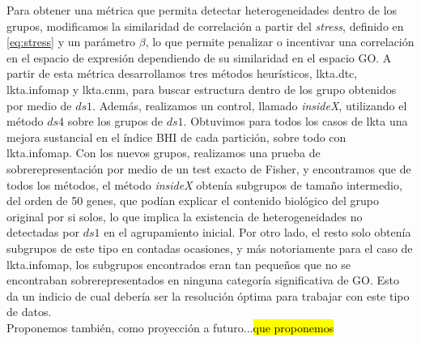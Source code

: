 Para obtener una métrica que permita detectar heterogeneidades dentro de los grupos, modificamos la similaridad de correlación a partir del \textit{stress}, definido en \ref{eq:stress} y un parámetro $\beta$, lo que permite penalizar o incentivar una correlación en el espacio de expresión dependiendo de su similaridad en el espacio GO. A partir de esta métrica desarrollamos tres métodos heurísticos, lkta.dtc, lkta.infomap y lkta.cnm, para buscar estructura dentro de los grupo obtenidos por medio de $ds1$. Además, realizamos un control, llamado \textit{insideX}, utilizando el método $ds4$ sobre los grupos de $ds1$. Obtuvimos para todos los casos de lkta una mejora sustancial en el índice BHI de cada partición, sobre todo con lkta.infomap. Con los nuevos grupos, realizamos una prueba de sobrerepresentación por medio de un test exacto de Fisher, y encontramos que de todos los métodos, el método \textit{insideX} obtenía subgrupos de tamaño intermedio, del orden de 50 genes, que podían explicar el contenido biológico del grupo original por si solos, lo que implica la existencia de heterogeneidades no detectadas por $ds1$ en el agrupamiento inicial. Por otro lado, el resto solo obtenía subgrupos de este tipo en contadas ocasiones, y más notoriamente para el caso de lkta.infomap, los subgrupos encontrados eran tan pequeños que no se encontraban sobrerepresentados en ninguna categoría significativa de GO. Esto da un indicio de cual debería ser la resolución óptima para trabajar con este tipo de datos.\\
Proponemos también, como proyección a futuro...\hl{que proponemos}








